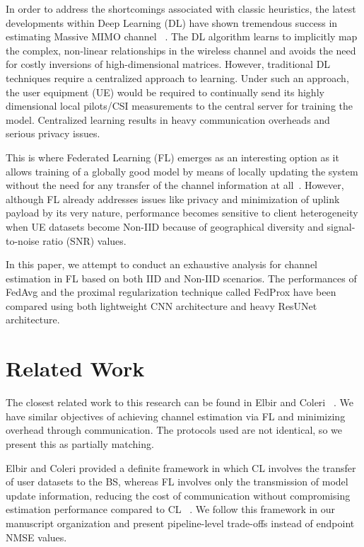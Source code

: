 \documentclass[runningheads]{llncs}
\begin{document}
In order to address the shortcomings associated with classic heuristics, the latest developments within Deep Learning (DL) have shown tremendous success in estimating Massive MIMO channel ~\cite{wen2018deep, he2018deep, ye2018power, soltani2019deep}. The DL algorithm learns to implicitly
map the complex, non-linear relationships in the wireless channel and avoids the need for costly inversions of high-dimensional matrices. However, traditional DL techniques require a centralized approach to learning. Under such an approach, the user equipment (UE) would be required to continually send its highly dimensional local pilots/CSI measurements to the central server for training the model. Centralized learning results in heavy communication overheads and serious privacy issues.

This is where Federated Learning (FL) emerges as an interesting option as it allows training of a globally good model by means of locally updating the system without the need for any transfer of the channel information at all~\cite{kairouz2021survey, ghosh2019robust}. However, although FL already addresses issues like privacy and minimization of uplink payload by its very nature, performance becomes sensitive to client heterogeneity when UE datasets become Non-IID because of geographical diversity and signal-to-noise ratio (SNR)  values.

In this paper, we attempt to conduct an exhaustive analysis for channel estimation in FL based on both IID and Non-IID scenarios. The performances of FedAvg and the proximal regularization technique called FedProx have been compared using both lightweight CNN architecture and heavy ResUNet architecture.

\section{Related Work}
The closest related work to this research can be found in Elbir and Coleri ~\cite{elbir2021flchannel}. We have similar objectives of achieving channel estimation via FL and minimizing overhead through communication. The protocols used are not identical, so we present this as partially matching.


Elbir and Coleri provided a definite framework in which CL involves the transfer of user datasets to the BS, whereas FL involves only the transmission of model update information, reducing the cost of communication without compromising estimation performance compared to CL ~\cite{elbir2021flchannel}. We follow this framework in our manuscript organization and present pipeline-level trade-offs instead of endpoint NMSE values.
\end{document}
